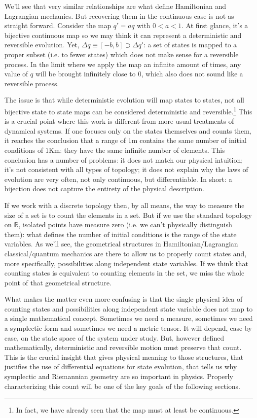 \documentclass[smallextended]{svjour3}
\numberwithin{equation}{section}
\begin{document}
We'll see that very similar relationships are what define Hamiltonian and Lagrangian mechanics. But recovering them in the continuous case is not as straight forward. Consider the map $q'=aq$ with $0<a<1$. At first glance, it's a bijective continuous map so we may think it can represent a deterministic and reversible evolution. Yet, $\Delta q \equiv [-b, b] \supset \Delta q'$: a set of states is mapped to a proper subset (i.e. to fewer states) which does not make sense for a reversible process. In the limit where we apply the map an infinite amount of times, any value of $q$ will be brought infinitely close to $0$, which also does not sound like a reversible process.

The issue is that while deterministic evolution will map states to states, not all bijective state to state maps can be considered deterministic and reversible.\footnote{In fact, we have already seen that the map must at least be continuous.} This is a crucial point where this work is different from more usual treatments of dynamical systems. If one focuses only on the states themselves and counts them, it reaches the conclusion that a range of $1$m contains the same number of initial conditions of $1$Km: they have the same infinite number of elements. This conclusion has a number of problems: it does not match our physical intuition; it's not consistent with all types of topology; it does not explain why the laws of evolution are very often, not only continuous, but differentiable. In short: a bijection does not capture the entirety of the physical description.

If we work with a discrete topology then, by all means, the way to measure the size of a set is to count the elements in a set. But if we use the standard topology on $\mathbb{R}$, isolated points have measure zero (i.e. we can't physically distinguish them): what defines the number of initial conditions is the range of the state variables. As we'll see, the geometrical structures in Hamiltonian/Lagrangian classical/quantum mechanics are there to allow us to properly count states and, more specifically, possibilities along independent state variables. If we think that counting states is equivalent to counting elements in the set, we miss the whole point of that geometrical structure.

What makes the matter even more confusing is that the single physical idea of counting states and possibilities along independent state variable does not map to a single mathematical concept. Sometimes we need a measure, sometimes we need a symplectic form and sometimes we need a metric tensor. It will depend, case by case, on the state space of the system under study. But, however defined mathematically, deterministic and reversible motion must preserve that count. This is the crucial insight that gives physical meaning to those structures, that justifies the use of differential equations for state evolution, that tells us why symplectic and Riemannian geometry are so important in physics. Properly characterizing this count will be one of the key goals of the following sections.
\end{document}
